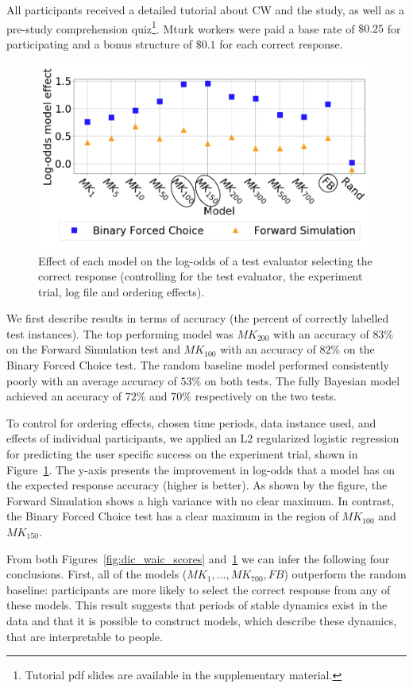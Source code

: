 \documentclass[letterpaper]{article} %
\begin{document}
All participants received a detailed tutorial about CW and the study, as well as a pre-study comprehension quiz\footnote{Tutorial pdf slides are available in the supplementary material.}. Mturk workers were paid a base rate of $\$0.25$ for participating and a bonus structure of $\$0.1$ for each correct response.






\begin{figure}[t]


\includegraphics[width=.48\textwidth]{images/combined_res_data_all.png}
\caption{Effect of each model on the log-odds of a test evaluator selecting the correct response (controlling for the test evaluator, the experiment trial, log file and ordering effects).}
\label{fig:essil_test_results}
\end{figure}


We first describe results in terms of accuracy (the percent of correctly labelled test instances).
The top performing model was $MK_{200}$ with an accuracy of $83\%$ on the Forward Simulation  test and $MK_{100}$  with an accuracy of $82\%$ on the Binary Forced Choice test.
The random baseline model performed consistently poorly with an average accuracy of $53\%$ on both tests.
The fully Bayesian model achieved an accuracy of $72\%$ and $70\%$ respectively on the two tests.

To control for ordering effects, chosen time periods, data instance used, and effects of individual participants, we applied an L2 regularized logistic regression for predicting  the user specific success on the experiment trial, shown  in  Figure~\ref{fig:essil_test_results}. The y-axis presents the improvement in log-odds that a model has on the expected response accuracy (higher is better).
As shown by the figure,  the Forward Simulation shows a high variance with no clear maximum. In contrast, the Binary Forced Choice test has a clear maximum in the region of $MK_{100}$ and $MK_{150}$.

From both Figures~\ref{fig:dic_waic_scores} and~\ref{fig:essil_test_results} we can infer the following four conclusions.
First, all of the models ($MK_{1},\ldots,MK_{700}, FB$) outperform the random baseline: participants are more likely to select the correct response from any of these models. This result suggests that periods of stable dynamics  exist in the data and that it is possible to construct models, which describe these dynamics, that are interpretable to people.
\end{document}
